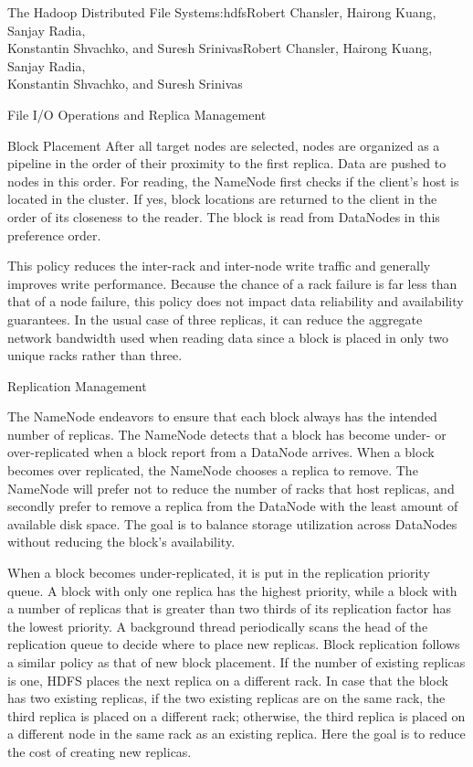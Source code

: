\begin{aosachaptertoc}{The Hadoop Distributed File System}{s:hdfs}{Robert Chansler, Hairong Kuang, Sanjay Radia, \\ Konstantin Shvachko, and Suresh Srinivas}{Robert Chansler, Hairong Kuang, Sanjay Radia, \\ \hspace*{0.9cm} Konstantin Shvachko, and Suresh Srinivas}
\begin{aosasect1}{File I/O Operations and Replica Management}
\begin{aosasect2}{Block Placement}
After all target nodes are selected, nodes are organized as a pipeline
in the order of their proximity to the first replica. Data are pushed
to nodes in this order. For reading, the NameNode first checks if the
client's host is located in the cluster. If yes, block locations are
returned to the client in the order of its closeness to the
reader. The block is read from DataNodes in this preference order.

This policy reduces the inter-rack and inter-node write traffic and
generally improves write performance. Because the chance of a rack
failure is far less than that of a node failure, this policy does not
impact data reliability and availability guarantees. In the usual case
of three replicas, it can reduce the aggregate network bandwidth used
when reading data since a block is placed in only two unique racks
rather than three.

\end{aosasect2}

\begin{aosasect2}{Replication Management}

The NameNode endeavors to ensure that each block always has the
intended number of replicas. The NameNode detects that a block has
become under- or over-replicated when a block report from a DataNode
arrives. When a block becomes over replicated, the NameNode chooses a
replica to remove. The NameNode will prefer not to reduce the number
of racks that host replicas, and secondly prefer to remove a replica
from the DataNode with the least amount of available disk space. The
goal is to balance storage utilization across DataNodes without
reducing the block's availability.

When a block becomes under-replicated, it is put in the replication
priority queue. A block with only one replica has the highest
priority, while a block with a number of replicas that is greater than
two thirds of its replication factor has the lowest priority. A
background thread periodically scans the head of the replication queue
to decide where to place new replicas. Block replication follows a
similar policy as that of new block placement. If the number of
existing replicas is one, HDFS places the next replica on a different
rack.  In case that the block has two existing replicas, if the two
existing replicas are on the same rack, the third replica is placed on
a different rack; otherwise, the third replica is placed on a
different node in the same rack as an existing replica. Here the goal
is to reduce the cost of creating new replicas.


\end{aosasect2}
\end{aosasect1}
\end{aosachaptertoc}
